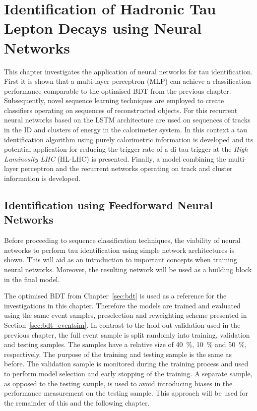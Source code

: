 \chapter{Identification of Hadronic Tau Lepton Decays using Neural Networks}
\label{sec:rnn}

This chapter investigates the application of neural networks for tau
identification. First it is shown that a multi-layer perceptron (MLP) can
achieve a classification performance comparable to the optimised BDT from the
previous chapter. Subsequently, novel sequence learning techniques are employed
to create classifiers operating on sequences of reconstructed objects. For this
recurrent neural networks based on the LSTM architecture are used on sequences
of tracks in the ID and clusters of energy in the calorimeter system. In this
context a tau identification algorithm using purely calorimetric information is
developed and its potential application for reducing the trigger rate of a
di-tau trigger at the \emph{High Luminosity LHC} (HL-LHC) is presented. Finally,
a model combining the multi-layer perceptron and the recurrent networks
operating on track and cluster information is developed.

\section{Identification using Feedforward Neural Networks}
\label{sec:ffnn_id}

Before proceeding to sequence classification techniques, the viability of neural
networks to perform tau identification using simple network architectures is
shown. This will aid as an introduction to important concepts when training
neural networks. Moreover, the resulting network will be used as a building
block in the final model.

The optimised BDT from Chapter~\ref{sec:bdt} is used as a reference for the
investigations in this chapter. Therefore the models are trained and evaluated
using the same event samples, preselection and reweighting scheme presented in
Section~\ref{sec:bdt_eventsim}. In contrast to the hold-out validation used in
the previous chapter, the full event sample is split randomly into training,
validation and testing samples. The samples have a relative size of
\SI{40}{\percent}, \SI{10}{\percent} and \SI{50}{\percent}, respectively. The
purpose of the training and testing sample is the same as before. The validation
sample is monitored during the training process and used to perform model
selection and early stopping of the training. A separate sample, as opposed to
the testing sample, is used to avoid introducing biases in the performance
measurement on the testing sample. This approach will be used for the remainder
of this and the following chapter.

